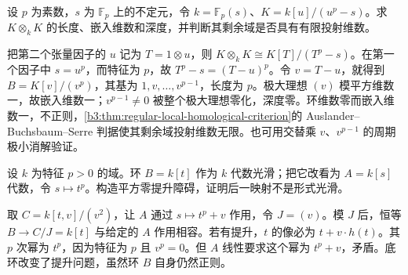 \begin{exercise}\label{b3:ex:18-pure-inseparable-thickening}
	设 \(p\) 为素数，\(s\) 为 \(\mathbb F_p\) 上的不定元，令 \(k=\mathbb F_p(s)\)、\(K=k[u]/(u^p-s)\)。求 \(K\otimes_kK\) 的长度、嵌入维数和深度，并判断其剩余域是否具有有限投射维数。
\end{exercise}
\begin{solution}
	把第二个张量因子的 \(u\) 记为 \(T=1\otimes u\)，则 \(K\otimes_kK\cong K[T]/(T^p-s)\)。在第一个因子中 \(s=u^p\)，而特征为 \(p\)，故 \(T^p-s=(T-u)^p\)。令 \(v=T-u\)，就得到 \(B=K[v]/(v^p)\)，其基为 \(1,v,\ldots,v^{p-1}\)，长度为 \(p\)。极大理想 \((v)\) 模平方维数一，故嵌入维数一；\(v^{p-1}\ne0\) 被整个极大理想零化，深度零。环维数零而嵌入维数一，不正则，\cref{b3:thm:regular-local-homological-criterion}的 Auslander–Buchsbaum–Serre 判据使其剩余域投射维数无限。也可用交替乘 \(v\)、\(v^{p-1}\) 的周期极小消解验证。
\end{solution}

\begin{exercise}\label{b3:ex:18-smooth-base-matters}
	设 \(k\) 为特征 \(p>0\) 的域。环 \(B=k[t]\) 作为 \(k\) 代数光滑；把它改看为 \(A=k[s]\) 代数，令 \(s\mapsto t^p\)。构造平方零提升障碍，证明后一映射不是形式光滑。
\end{exercise}
\begin{solution}
	取 \(C=k[t,v]/(v^2)\)，让 \(A\) 通过 \(s\mapsto t^p+v\) 作用，令 \(J=(v)\)。模 \(J\) 后，恒等 \(B\to C/J=k[t]\) 与给定的 \(A\) 作用相容。若有提升，\(t\) 的像必为 \(t+v\cdot h(t)\)。其 \(p\) 次幂为 \(t^p\)，因为特征为 \(p\) 且 \(v^p=0\)。但 \(A\) 线性要求这个幂为 \(t^p+v\)，矛盾。底环改变了提升问题，虽然环 \(B\) 自身仍然正则。
\end{solution}
